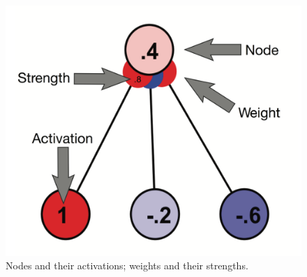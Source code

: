 \begin{figure}[h]
\centering
\includegraphics[scale=.2]{./images/labelledNet.png}
\caption[Simbrain screenshot with additional elements added by Pamela Payne.]{Nodes and their activations; weights and their strengths.}
\label{nodesWeights}
\end{figure}

